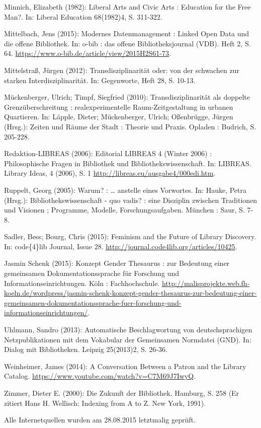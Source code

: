 Minnich, Elizabeth (1982): Liberal Arts and Civic Arts : Education for
the Free Man?. In: Liberal Education 68(1982)4, S. 311-322.

Mittelbach, Jens (2015): Modernes Datenmanagement : Linked Open Data und
die offene Bibliothek. In: o-bib : das offene Bibliotheksjournal (VDB).
Heft 2, S. 64. \url{https://www.o-bib.de/article/view/2015H2S61-73}.

Mittelstraß, Jürgen (2012): Transdisziplinarität oder: von der schwachen
zur starken Interdisziplinarität. In: Gegenworte, Heft 28, S. 10-13.

Mückenberger, Ulrich; Timpf, Siegfried (2010): Transdisziplinarität als
doppelte Grenzüberschreitung : realexperimentelle Raum-Zeitgestaltung in
urbanen Quartieren. In: Läpple, Dieter; Mückenberger, Ulrich;
Oßenbrügge, Jürgen (Hrsg.): Zeiten und Räume der Stadt : Theorie und
Praxis. Opladen : Budrich, S. 205-228.

Redaktion-LIBREAS (2006): Editorial LIBREAS 4 (Winter 2006) :
Philosophische Fragen in Bibliothek und Bibliothekswissenschaft. In:
LIBREAS. Library Ideas, 4 (2006), S. 1
\url{http://libreas.eu/ausgabe4/000edi.htm}.

Ruppelt, Georg (2005): Warum? : \ldots{} anstelle eines Vorwortes. In:
Hauke, Petra (Hrsg.): Bibliothekswissenschaft - quo vadis? : eine
Disziplin zwischen Traditionen und Visionen ; Programme, Modelle,
Forschungsaufgaben. München : Saur, S. 7-8.

Sadler, Bess; Bourg, Chris (2015): Feminism and the Future of Library
Discovery. In: code\{4\}lib Journal, Issue 28.
\url{http://journal.code4lib.org/articles/10425}.

Jasmin Schenk (2015): Konzept Gender Thesaurus : zur Bedeutung einer
gemeinsamen Dokumentationssprache für Forschung und
Informationseinrichtungen. Köln : Fachhochschule.
\url{http://malisprojekte.web.fh-koeln.de/wordpress/jasmin-schenk-konzept-gender-thesaurus-zur-bedeutung-einer-gemeinsamen-dokumentationssprache-fuer-forschung-und-informationseinrichtungen/}.

Uhlmann, Sandro (2013): Automatische Beschlagwortung von
deutschsprachigen Netzpublikationen mit dem Vokabular der Gemeinsamen
Normdatei (GND). In: Dialog mit Bibliotheken. Leipzig 25(2013)2, S.
26-36.

Weinheimer, James (2014): A Conversation Between a Patron and the
Library Catalog. \url{https://www.youtube.com/watch?v=C7M69J7IwyQ}.

Zimmer, Dieter E. (2000): Die Zukunft der Bibliothek. Hamburg, S. 258
(Er zitiert Hans H. Wellisch: Indexing from A to Z. New York, 1991).

Alle Internetquellen wurden am 28.08.2015 letztmalig geprüft. 
